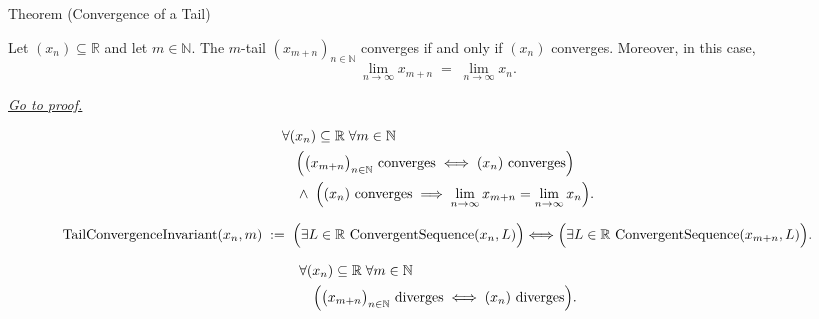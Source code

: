 \begin{theorembox}{Theorem (Convergence of a Tail)}
\begin{theorem}
\label{thm:convergence-of-tail}

Let $(x_n) \subseteq \mathbb{R}$ and let $m \in \mathbb{N}$. The
$m$-tail $(x_{m+n})_{n \in \mathbb{N}}$ converges if and only if
$(x_n)$ converges. Moreover, in this case,
\[
    \lim_{n \to \infty} x_{m+n} \;=\; \lim_{n \to \infty} x_n.
\]

\smallskip
\noindent
\hyperref[prf:convergence-of-tail]{\textit{Go to proof.}}
\end{theorem}
\end{theorembox}

\begin{remark*}
\[
\begin{aligned}
&\forall (x_n) \subseteq \mathbb{R} \;\forall m \in \mathbb{N}\\
&\quad\Bigl(
    \bigl(x_{m+n}\bigr)_{n \in \mathbb{N}} \text{ converges}
    \;\Longleftrightarrow\;
    (x_n) \text{ converges}
\Bigr)\\
&\quad\land\;\Bigl(
    (x_n) \text{ converges}
    \;\Longrightarrow\;
    \lim_{n\to\infty} x_{m+n} = \lim_{n\to\infty} x_n
\Bigr).
\end{aligned}
\]
\end{remark*}

\begin{remark*}
\[
\operatorname{TailConvergenceInvariant}(x_n,m)
\;:=\;
\Bigl(\exists L\in\mathbb{R}\,\operatorname{ConvergentSequence}(x_n,L)\Bigr)
\Longleftrightarrow
\Bigl(\exists L\in\mathbb{R}\,\operatorname{ConvergentSequence}(x_{m+n},L)\Bigr).
\]
\end{remark*}

\begin{remark*}
\[
\begin{aligned}
&\forall (x_n) \subseteq \mathbb{R} \;\forall m \in \mathbb{N}\\
&\quad\Bigl(
    \bigl(x_{m+n}\bigr)_{n \in \mathbb{N}} \text{ diverges}
    \;\Longleftrightarrow\;
    (x_n) \text{ diverges}
\Bigr).
\end{aligned}
\]
\end{remark*}

